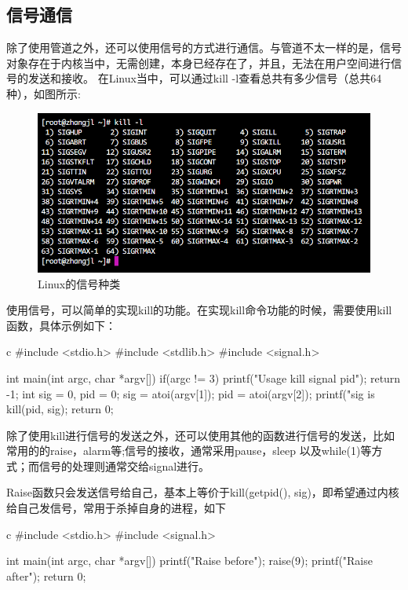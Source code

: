 \subsection{信号通信}
除了使用管道之外，还可以使用信号的方式进行通信。与管道不太一样的是，信号对象存在于内核当中，无需创建，本身已经存在了，并且，无法在用户空间进行信号的发送和接收。
在Linux当中，可以通过kill -l查看总共有多少信号（总共64种），如图所示:
\begin{figure}[H]
  \centering
  \includegraphics[width=\linewidth]{signal.png}
  \caption{Linux的信号种类}
  \label{fig:signal}
\end{figure}

使用信号，可以简单的实现kill的功能。在实现kill命令功能的时候，需要使用kill函数，具体示例如下：
\begin{code-block}{c}
#include <stdio.h>
#include <stdlib.h>
#include <signal.h>

int main(int argc, char *argv[])
{
        if(argc != 3)
        {
                printf("Usage kill signal pid\n");
                return -1;
        }
        int sig = 0, pid = 0;
        sig = atoi(argv[1]);
        pid = atoi(argv[2]);
        printf("sig is %
        kill(pid, sig);
        return 0;
}
\end{code-block}

除了使用kill进行信号的发送之外，还可以使用其他的函数进行信号的发送，比如常用的的raise，alarm等;信号的接收，通常采用pause，sleep
以及while(1)等方式；而信号的处理则通常交给signal进行。

Raise函数只会发送信号给自己，基本上等价于kill(getpid(), sig)，即希望通过内核给自己发信号，常用于杀掉自身的进程，如下
\begin{code-block}{c}
#include <stdio.h>
#include <signal.h>

int main(int argc, char *argv[])
{
        printf("Raise before\n");
        raise(9);
        printf("Raise after\n");
        return 0;
}
\end{code-block}

